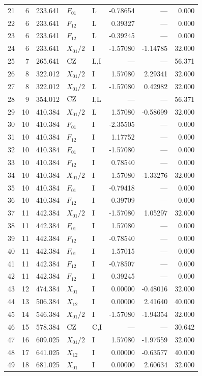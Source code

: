 {\begin{longtable}{@{}rrrllrrr@{}}
21 & 6 & 233.641 & $F_{01}$ & L & -0.78654 & --- & 0.000\\
22 & 6 & 233.641 & $F_{12}$ & L & 0.39327 & --- & 0.000\\
23 & 6 & 233.641 & $F_{12}$ & L & -0.39245 & --- & 0.000\\
24 & 6 & 233.641 & $X_{01}/2$ & I & -1.57080 & -1.14785 & 32.000\\
25 & 7 & 265.641 & $\mathrm{CZ}$ & L,I & --- & --- & 56.371\\
26 & 8 & 322.012 & $X_{01}/2$ & I & 1.57080 & 2.29341 & 32.000\\
27 & 8 & 322.012 & $X_{01}/2$ & L & -1.57080 & 0.42982 & 32.000\\
28 & 9 & 354.012 & $\mathrm{CZ}$ & I,L & --- & --- & 56.371\\
29 & 10 & 410.384 & $X_{01}/2$ & L & 1.57080 & -0.58699 & 32.000\\
30 & 10 & 410.384 & $F_{01}$ & I & -2.35505 & --- & 0.000\\
31 & 10 & 410.384 & $F_{12}$ & I & 1.17752 & --- & 0.000\\
32 & 10 & 410.384 & $F_{01}$ & I & -1.57080 & --- & 0.000\\
33 & 10 & 410.384 & $F_{12}$ & I & 0.78540 & --- & 0.000\\
34 & 10 & 410.384 & $X_{01}/2$ & I & 1.57080 & -1.33276 & 32.000\\
35 & 10 & 410.384 & $F_{01}$ & I & -0.79418 & --- & 0.000\\
36 & 10 & 410.384 & $F_{12}$ & I & 0.39709 & --- & 0.000\\
37 & 11 & 442.384 & $X_{01}/2$ & I & -1.57080 & 1.05297 & 32.000\\
38 & 11 & 442.384 & $F_{01}$ & I & 1.57080 & --- & 0.000\\
39 & 11 & 442.384 & $F_{12}$ & I & -0.78540 & --- & 0.000\\
40 & 11 & 442.384 & $F_{01}$ & I & 1.57015 & --- & 0.000\\
41 & 11 & 442.384 & $F_{12}$ & I & -0.78507 & --- & 0.000\\
42 & 11 & 442.384 & $F_{12}$ & I & 0.39245 & --- & 0.000\\
43 & 12 & 474.384 & $X_{01}$ & I & 0.00000 & -0.48016 & 32.000\\
44 & 13 & 506.384 & $X_{12}$ & I & 0.00000 & 2.41640 & 40.000\\
45 & 14 & 546.384 & $X_{01}/2$ & I & -1.57080 & -1.94354 & 32.000\\
46 & 15 & 578.384 & $\mathrm{CZ}$ & C,I & --- & --- & 30.642\\
47 & 16 & 609.025 & $X_{01}/2$ & I & 1.57080 & -1.97559 & 32.000\\
48 & 17 & 641.025 & $X_{12}$ & I & 0.00000 & -0.63577 & 40.000\\
49 & 18 & 681.025 & $X_{01}$ & I & 0.00000 & 2.60634 & 32.000\\
\end{longtable}}
